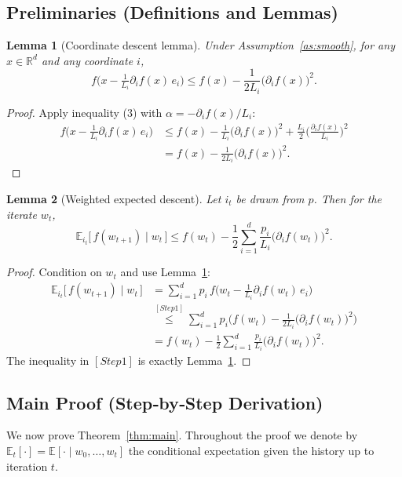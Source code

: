 \documentclass{article}
\newtheorem{lemma}{Lemma}
\newcommand{\E}{\mathbb{E}}
\newcommand{\R}{\mathbb{R}}
\begin{document}
\subsection*{Preliminaries (Definitions and Lemmas)}
\begin{lemma}[Coordinate descent lemma]\label{lem:descent}
Under Assumption~\ref{as:smooth}, for any $x\in\R^{d}$ and any coordinate $i$,
\[
f\!\big(x-\tfrac{1}{L_i}\partial_i f(x)\,e_i\big)\le 
f(x)-\frac{1}{2L_i}\big(\partial_i f(x)\big)^{2}.
\tag{5}
\]
\end{lemma}
\begin{proof}
Apply inequality (3) with $\alpha=-\partial_i f(x)/L_i$:
\[
\begin{aligned}
f\!\big(x-\tfrac{1}{L_i}\partial_i f(x)\,e_i\big)
&\le f(x)-\frac{1}{L_i}\big(\partial_i f(x)\big)^{2}
   +\frac{L_i}{2}\Big(\frac{\partial_i f(x)}{L_i}\Big)^{2}\\
&= f(x)-\frac{1}{2L_i}\big(\partial_i f(x)\big)^{2}.
\end{aligned}
\]
\end{proof}

\begin{lemma}[Weighted expected descent]\label{lem:expdescent}
Let $i_t$ be drawn from $p$.  Then for the iterate $w_t$,
\[
\E_{i_t}\!\big[\,f(w_{t+1})\mid w_t\,\big]
\le f(w_t)-\frac{1}{2}\sum_{i=1}^{d}\frac{p_i}{L_i}
\big(\partial_i f(w_t)\big)^{2}.
\tag{6}
\]
\end{lemma}
\begin{proof}
Condition on $w_t$ and use Lemma~\ref{lem:descent}:
\[
\begin{aligned}
\E_{i_t}\!\big[\,f(w_{t+1})\mid w_t\,\big]
&=\sum_{i=1}^{d}p_i\,
   f\!\big(w_t-\tfrac{1}{L_i}\partial_i f(w_t)\,e_i\big)\\
&\overset{[Step 1]}{\le}
\sum_{i=1}^{d}p_i\Big(
   f(w_t)-\frac{1}{2L_i}\big(\partial_i f(w_t)\big)^{2}\Big)\\
&= f(w_t)-\frac{1}{2}\sum_{i=1}^{d}\frac{p_i}{L_i}
   \big(\partial_i f(w_t)\big)^{2}.
\end{aligned}
\]
The inequality in \([Step 1]\) is exactly Lemma~\ref{lem:descent}.
\end{proof}

\subsection*{Main Proof (Step‑by‑Step Derivation)}
We now prove Theorem~\ref{thm:main}.  Throughout the proof we denote by
$\E_t[\cdot]=\E[\cdot\mid w_0,\dots ,w_t]$ the conditional expectation given the history up to iteration $t$.
\end{document}
